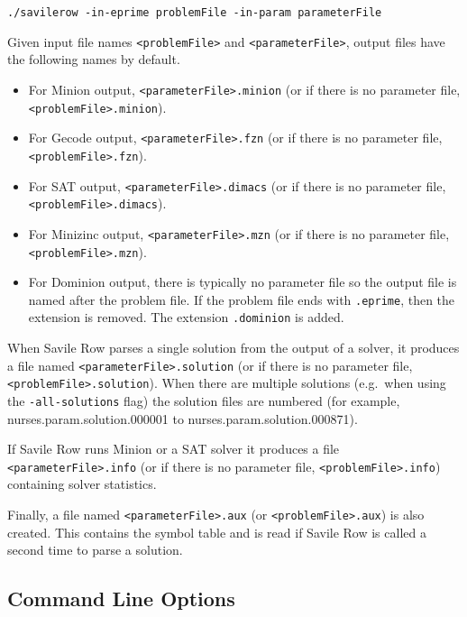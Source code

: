 \documentclass[a4paper]{article}
\newcommand{\savilerow}{{\sc Savile Row}\xspace}
\begin{document}
\begin{verbatim}
./savilerow -in-eprime problemFile -in-param parameterFile
\end{verbatim}

Given input file names \texttt{<problemFile>} and \texttt{<parameterFile>}, output files have the following
names by default.

\begin{itemize}
\item For Minion output, \texttt{<parameterFile>.minion} (or if there is no parameter file, 
\texttt{<problemFile>.minion}).
\item For Gecode output, \texttt{<parameterFile>.fzn} (or if there is no parameter file, 
\texttt{<problemFile>.fzn}).
\item For SAT output, \texttt{<parameterFile>.dimacs} (or if there is no parameter file, 
\texttt{<problemFile>.dimacs}).
\item For Minizinc output, \texttt{<parameterFile>.mzn} (or if there is no parameter file, 
\texttt{<problemFile>.mzn}).
\item For Dominion output, there is typically no parameter file so the output file is named
after the problem file. If the problem file ends with \texttt{.eprime}, then the extension
is removed. The extension \texttt{.dominion} is added. 
\end{itemize}

\begin{sloppypar}
When \savilerow parses a single solution from the output of a solver, it produces a file named
\texttt{<parameterFile>.solution} (or if there is no parameter file, 
\texttt{<problemFile>.solution}). When there are multiple solutions (e.g.\ when using
the \texttt{-all-solutions} flag) the solution files are numbered (for example, 
nurses.param.solution.000001 to nurses.param.solution.000871). 

If \savilerow runs Minion or a SAT solver it produces a file \texttt{<parameterFile>.info} (or if there is no parameter file, 
\texttt{<problemFile>.info}) containing solver statistics.

Finally, a file named \texttt{<parameterFile>.aux}
(or \texttt{<problemFile>.aux}) is also created. This contains the symbol table
and is read if \savilerow is called a second time to parse a solution. 
\end{sloppypar}

\subsection{Command Line Options}
\end{document}
